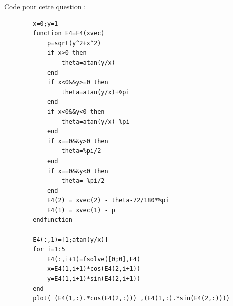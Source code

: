 \documentclass[11pt]{article}
\begin{document}
    Code pour cette question :
    \begin{verbatim}
        x=0;y=1
        function E4=F4(xvec)
            p=sqrt(y^2+x^2)
            if x>0 then
                theta=atan(y/x)
            end
            if x<0&&y>=0 then
                theta=atan(y/x)+%pi
            end
            if x<0&&y<0 then
                theta=atan(y/x)-%pi
            end
            if x==0&&y>0 then
                theta=%pi/2
            end
            if x==0&&y<0 then
                theta=-%pi/2
            end
            E4(2) = xvec(2) - theta-72/180*%pi
            E4(1) = xvec(1) - p
        endfunction

        E4(:,1)=[1;atan(y/x)]
        for i=1:5
            E4(:,i+1)=fsolve([0;0],F4)
            x=E4(1,i+1)*cos(E4(2,i+1))
            y=E4(1,i+1)*sin(E4(2,i+1))
        end
        plot( (E4(1,:).*cos(E4(2,:))) ,(E4(1,:).*sin(E4(2,:))))
    \end{verbatim}
\end{document}
